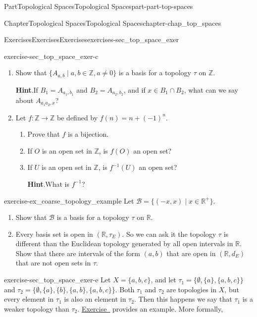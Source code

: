 \documentclass[oneside,10pt,]{book}
\newcommand{\blocktitlefont}{\relax}
\newcommand{\xreffont}{\relax}
\numberwithin{equation}{chapter}
\newcommand{\Z}{\mathbb{Z}}
\newcommand{\R}{\mathbb{R}}
\newcommand{\B}{\mathcal{B}}
\begin{document}
\begin{partptx}{Part}{Topological Spaces}{}{Topological Spaces}{}{}{part-part-top-spaces}
\begin{chapterptx}{Chapter}{Topological Spaces}{}{Topological Spaces}{}{}{chapter-chap_top_spaces}
\begin{exercises-section}{Exercises}{Exercises}{}{Exercises}{}{}{exercises-sec_top_space_exer}
\begin{divisionexercise}{3}{}{}{exercise-sec_top_space_exer-c}
\begin{enumerate}[font=\bfseries,label=(\alph*),ref=\alph*]%
\item{}Show that \(\{A_{a,b} \mid a, b \in \Z, a \neq 0\}\) is a basis for a topology \(\tau\) on \(\Z\).%
\par\smallskip%
\noindent\textbf{\blocktitlefont Hint}.\hypertarget{hint-sec_top_space_exer-c-b-b}{}\quad{}If \(B_1 = A_{a_1,b_1}\) and \(B_2 = A_{a_2,b_2}\), and if \(x \in B_1 \cap B_2\), what can we say about \(A_{a_1a_2,x}\)?%
\item{}Let \(f : \Z \to \Z\) be defined by \(f(n) = n + (-1)^n\).%
\begin{enumerate}[font=\bfseries,label=(\roman*),ref=\theenumi.\roman*]%
\item{}Prove that \(f\) is a bijection.%
\item{}If \(O\) is an open set in \(\Z\), is \(f(O)\) an open set?%
\item{}If \(U\) is an open set in \(\Z\), is \(f^{-1}(U)\) an open set?%
\par\smallskip%
\noindent\textbf{\blocktitlefont Hint}.\hypertarget{hint-sec_top_space_exer-c-c-d-b}{}\quad{}What is \(f^{-1}\)?%
\end{enumerate}%
\end{enumerate}%
\end{divisionexercise}%
\begin{divisionexercise}{4}{}{}{exercise-ex_coarse_topology_example}%
Let \(\B = \{(-x,x) \mid x \in \R^+\}\).%
\begin{enumerate}[font=\bfseries,label=(\alph*),ref=\alph*]%
\item{}Show that \(\B\) is a basis for a topology \(\tau\) on \(\R\).%
\item{}Every basis set is open in \((\R, \tau_E)\). So we can ask it the topology \(\tau\) is different than the Euclidean topology generated by all open intervals in \(\R\). Show that there are intervals of the form \((a,b)\) that are open in \((\R, d_E)\) that are not open sets in \(\tau\).%
\end{enumerate}%
\end{divisionexercise}%
\begin{divisionexercise}{5}{}{}{exercise-sec_top_space_exer-e}%
Let \(X = \{a,b,c\}\), and let \(\tau_1 = \{\emptyset, \{a\}, \{a,b,c\}\}\) and \(\tau_2 = \{\emptyset, \{a\}, \{b\}, \{a,b\}, \{a,b,c\}\}\). Both \(\tau_1\) and \(\tau_2\) are topologies in \(X\), but every element in \(\tau_1\) is also an element in \(\tau_2\). Then this happens we say that \(\tau_1\) is a weaker topology than \(\tau_2\). \hyperlink{exercise-ex_coarse_topology_example}{Exercise~{\xreffont 4}} provides an example. More formally,%

\end{divisionexercise}
\end{exercises-section}
\end{chapterptx}
\end{partptx}
\end{document}
